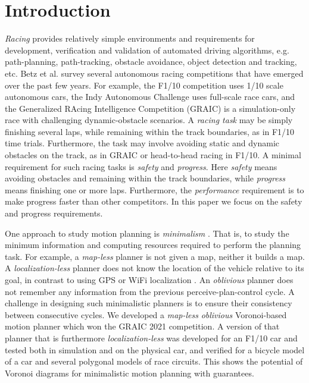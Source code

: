 \section{Introduction}

\emph{Racing} provides relatively simple environments and requirements for development, verification and validation of automated driving algorithms, e.g. path-planning, path-tracking, obstacle avoidance, object detection and tracking, etc.
%
Betz et al. \cite{Betz.2022} survey several autonomous racing competitions that have emerged over the past few years.
%
For example, the F1/10 competition uses 1/10 scale autonomous cars, the Indy Autonomous Challenge uses full-scale race cars, and the Generalized RAcing Intelligence Competition (GRAIC) is a simulation-only race with challenging dynamic-obstacle scenarios.
%
A \emph{racing task} may be simply finishing several laps, while remaining within the track boundaries, as in F1/10 time trials.
%
Furthermore, the task may involve avoiding static and dynamic obstacles on the track, as in GRAIC or head-to-head racing in F1/10.
%
A minimal requirement for such racing tasks is \emph{safety} and \emph{progress}.
%
Here \emph{safety} means avoiding obstacles and remaining within the track boundaries, while \emph{progress} means finishing one or more laps.
%
Furthermore, the \emph{performance} requirement is to make progress faster than other competitors.
%
In this paper we focus on the safety and progress requirements.


One approach to study motion planning is \emph{minimalism} \cite{Tovar.2009}.
%
That is, to study the minimum information and computing resources required to perform the planning task.
%
For example, a \emph{map-less} \cite{Tai.2017} planner is not given a map, neither it builds a map.
%
A \emph{localization-less} planner does not know the location of the vehicle relative to its goal, in contrast to using GPS or WiFi localization \cite{Tai.2017}.
%
An \emph{oblivious} \cite{Flocchini.2012} planner does not remember any information from the previous perceive-plan-control cycle.
%
A challenge in designing such minimalistic planners is to ensure their consistency between consecutive cycles.
%
We developed a \emph{map-less} \emph{oblivious} Voronoi-based motion planner which won the GRAIC 2021 competition.
%
A version of that planner that is furthermore \emph{localization-less} was developed for an F1/10 car and tested both in simulation and on the physical car, and verified for a bicycle model of a car and several polygonal models of race circuits.
%
This shows the potential of Voronoi diagrams for minimalistic motion planning with guarantees.


